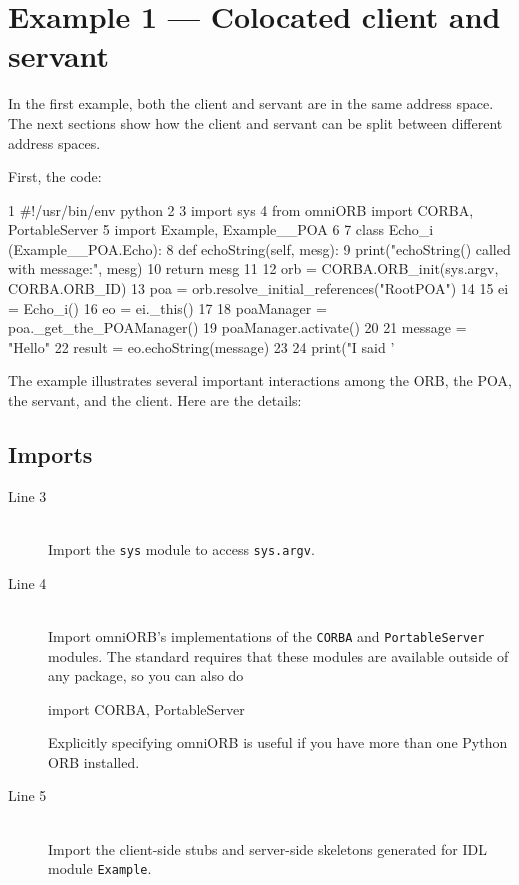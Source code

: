 \documentclass[11pt,oneside,a4paper]{book}
\newcommand{\module}[1]{\texttt{#1}}
\newcommand{\code}[1]{\texttt{#1}}
\begin{document}
\section{Example 1 --- Colocated client and servant}
\label{sec:eg1}

In the first example, both the client and servant are in the same
address space. The next sections show how the client and servant can
be split between different address spaces.

First, the code:

\lstset{numbers=left,gobble=4}
\begin{pylisting}
 1  #!/usr/bin/env python
 2  
 3  import sys
 4  from omniORB import CORBA, PortableServer
 5  import Example, Example__POA
 6  
 7  class Echo_i (Example__POA.Echo):
 8      def echoString(self, mesg):
 9          print("echoString() called with message:", mesg)
10          return mesg
11  
12  orb = CORBA.ORB_init(sys.argv, CORBA.ORB_ID)
13  poa = orb.resolve_initial_references("RootPOA")
14  
15  ei = Echo_i()
16  eo = ei._this()
17  
18  poaManager = poa._get_the_POAManager()
19  poaManager.activate()
20  
21  message = "Hello"
22  result  = eo.echoString(message)
23
24  print("I said '%
\end{pylisting}
\lstset{numbers=none,gobble=0}

\noindent The example illustrates several important interactions among
the ORB, the POA, the servant, and the client. Here are the details:

\subsection{Imports}

\begin{description}

\item[Line 3]\mbox{}\\
%
Import the \module{sys} module to access \code{sys.argv}.

\item[Line 4]\mbox{}\\
%
Import omniORB's implementations of the \module{CORBA} and
\module{PortableServer} modules. The standard requires that these
modules are available outside of any package, so you can also do

\begin{pylisting}
import CORBA, PortableServer
\end{pylisting}

\noindent Explicitly specifying omniORB is useful if you have more
than one Python ORB installed.

\item[Line 5]\mbox{}\\
%
Import the client-side stubs and server-side skeletons generated for
IDL module \module{Example}.

\end{description}
\end{document}
